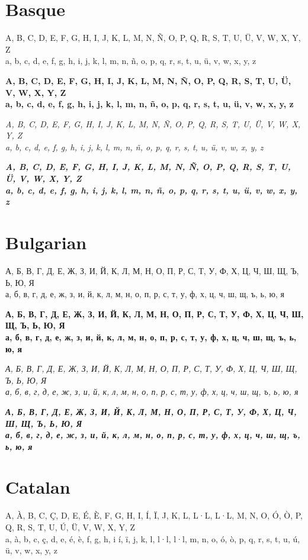 \documentclass[12pt]{article}
\begin{document}
\section{Basque}
A, B, C, D, E, F, G, H, I, J, K, L, M, N, Ñ, O, P, Q, R, S, T, U, Ü, V, W, X, Y, Z \\
a, b, c, d, e, f, g, h, i, j, k, l, m, n, ñ, o, p, q, r, s, t, u, ü, v, w, x, y, z
 
\textbf {
A, B, C, D, E, F, G, H, I, J, K, L, M, N, Ñ, O, P, Q, R, S, T, U, Ü, V, W, X, Y, Z \\
a, b, c, d, e, f, g, h, i, j, k, l, m, n, ñ, o, p, q, r, s, t, u, ü, v, w, x, y, z
}

\textit{
A, B, C, D, E, F, G, H, I, J, K, L, M, N, Ñ, O, P, Q, R, S, T, U, Ü, V, W, X, Y, Z \\
a, b, c, d, e, f, g, h, i, j, k, l, m, n, ñ, o, p, q, r, s, t, u, ü, v, w, x, y, z
}

\textbf{\textit{
A, B, C, D, E, F, G, H, I, J, K, L, M, N, Ñ, O, P, Q, R, S, T, U, Ü, V, W, X, Y, Z \\
a, b, c, d, e, f, g, h, i, j, k, l, m, n, ñ, o, p, q, r, s, t, u, ü, v, w, x, y, z
}}


\section{Bulgarian}
А, Б, В, Г, Д, Е, Ж, З, И, Й, К, Л, М, Н, О, П, Р, С, Т, У, Ф, Х, Ц, Ч, Ш, Щ, Ъ, Ь, Ю, Я \\
а, б, в, г, д, е, ж, з, и, й, к, л, м, н, о, п, р, с, т, у, ф, х, ц, ч, ш, щ, ъ, ь, ю, я

\textbf{
А, Б, В, Г, Д, Е, Ж, З, И, Й, К, Л, М, Н, О, П, Р, С, Т, У, Ф, Х, Ц, Ч, Ш, Щ, Ъ, Ь, Ю, Я \\
а, б, в, г, д, е, ж, з, и, й, к, л, м, н, о, п, р, с, т, у, ф, х, ц, ч, ш, щ, ъ, ь, ю, я
}

\textit{
А, Б, В, Г, Д, Е, Ж, З, И, Й, К, Л, М, Н, О, П, Р, С, Т, У, Ф, Х, Ц, Ч, Ш, Щ, Ъ, Ь, Ю, Я \\
а, б, в, г, д, е, ж, з, и, й, к, л, м, н, о, п, р, с, т, у, ф, х, ц, ч, ш, щ, ъ, ь, ю, я
}

\textbf{\textit{
А, Б, В, Г, Д, Е, Ж, З, И, Й, К, Л, М, Н, О, П, Р, С, Т, У, Ф, Х, Ц, Ч, Ш, Щ, Ъ, Ь, Ю, Я \\
а, б, в, г, д, е, ж, з, и, й, к, л, м, н, о, п, р, с, т, у, ф, х, ц, ч, ш, щ, ъ, ь, ю, я
}}


\clearpage
\section{Catalan}
A, À, B, C, Ç, D, E, É, È, F, G, H, I, Í, Ï, J, K, L, L·L, L·L, M, N, O, Ó, Ò, P, Q, R, S, T, U, Ú, Ü, V, W, X, Y, Z \\
a, à, b, c, ç, d, e, é, è, f, g, h, i í, ï, j, k, l, l·l, l·l, m, n, o, ó, ò, p, q, r, s, t, u, ú, ü, v, w, x, y, z
\end{document}

